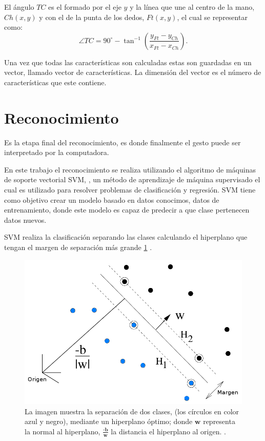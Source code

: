 El ángulo $TC$ es el formado por el eje $y$ y la línea que une al centro de la mano, $Ch(x,y)$ y con el de la punta de los dedos, $Ft(x,y)$, el cual se representar como:
$$ \angle TC = 90^\circ - \tan^{-1} \left( \frac{ y_{Ft}-y_{Ch} }{ x_{Ft}-x_{Ch} } \right).$$


Una vez que todas las características son calculadas estas son guardadas en un vector, llamado vector de características. La dimensión del vector es el número de características que este contiene. 




\section{Reconocimiento}\label{sec:SVM} 

Es la etapa final del reconocimiento, es donde finalmente el gesto puede ser interpretado por la computadora.  

En este trabajo el reconocimiento se realiza utilizando el algoritmo de máquinas de soporte vectorial SVM, \citep{Cortes1995}, un método de aprendizaje de máquina supervisado el cual es utilizado para resolver problemas de clasificación y regresión. SVM tiene como objetivo crear un modelo basado en datos conocimos, datos de entrenamiento, donde este modelo es capaz de predecir a que clase pertenecen datos nuevos. 

SVM realiza la clasificación separando las clases calculando el hiperplano que tengan el margen de separación más grande \ref{fig:SVM} .  

\begin{figure}[h!]
\begin{center}
\includegraphics[scale=.55]{./Figures/SVMarticle.png}
\end{center}
\caption{La imagen muestra la separación de dos clases, (los círculos en color azul y negro), mediante un hiperplano óptimo; donde $\textbf{w}$ representa la normal al hiperplano, $\frac{\textbf{-b}}{\textbf{w}}$ la distancia el hiperplano al origen. \citep{Burges1998}.}
\label{fig:SVM}
\end{figure} 

